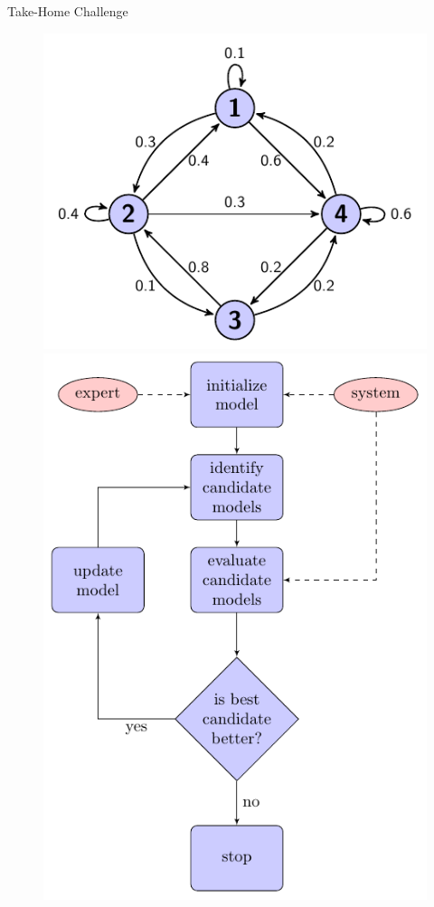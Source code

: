 \documentclass{beamer}\usepackage[]{graphicx}\usepackage[]{color}
\begin{document}
\begin{frame}{Take-Home Challenge}

\begin{figure}[h]
     \centering
      \includegraphics[scale=.6]{graph.pdf}
     \includegraphics[scale=.6]{SimpleFlowChart.pdf}
    
     \label{fig:SimpleFlowChart}
\end{figure}

\end{frame}
\end{document}
